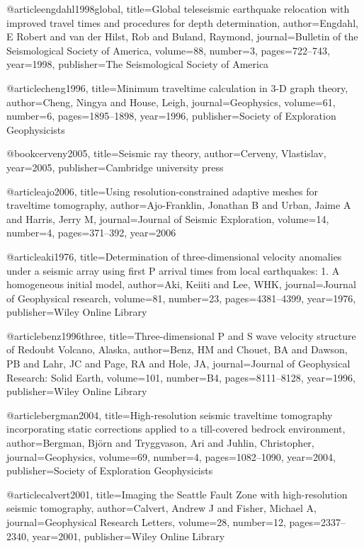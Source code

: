 @article{engdahl1998global,
  title={Global teleseismic earthquake relocation with improved travel times and procedures for depth determination},
  author={Engdahl, E Robert and van der Hilst, Rob and Buland, Raymond},
  journal={Bulletin of the Seismological Society of America},
  volume={88},
  number={3},
  pages={722--743},
  year={1998},
  publisher={The Seismological Society of America}
}

@article{cheng1996,
  title={Minimum traveltime calculation in 3-D graph theory},
  author={Cheng, Ningya and House, Leigh},
  journal={Geophysics},
  volume={61},
  number={6},
  pages={1895--1898},
  year={1996},
  publisher={Society of Exploration Geophysicists}
}

@book{cerveny2005,
  title={Seismic ray theory},
  author={Cerveny, Vlastislav},
  year={2005},
  publisher={Cambridge university press}
}


@article{ajo2006,
  title={Using resolution-constrained adaptive meshes for traveltime tomography},
  author={Ajo-Franklin, Jonathan B and Urban, Jaime A and Harris, Jerry M},
  journal={Journal of Seismic Exploration},
  volume={14},
  number={4},
  pages={371--392},
  year={2006}
}

@article{aki1976,
  title={Determination of three-dimensional velocity anomalies under a seismic array using first P arrival times from local earthquakes: 1. A homogeneous initial model},
  author={Aki, Keiiti and Lee, WHK},
  journal={Journal of Geophysical research},
  volume={81},
  number={23},
  pages={4381--4399},
  year={1976},
  publisher={Wiley Online Library}
}


@article{benz1996three,
  title={Three-dimensional P and S wave velocity structure of Redoubt Volcano, Alaska},
  author={Benz, HM and Chouet, BA and Dawson, PB and Lahr, JC and Page, RA and Hole, JA},
  journal={Journal of Geophysical Research: Solid Earth},
  volume={101},
  number={B4},
  pages={8111--8128},
  year={1996},
  publisher={Wiley Online Library}
}

@article{bergman2004,
  title={High-resolution seismic traveltime tomography incorporating static corrections applied to a till-covered bedrock environment},
  author={Bergman, Bj{\"o}rn and Tryggvason, Ari and Juhlin, Christopher},
  journal={Geophysics},
  volume={69},
  number={4},
  pages={1082--1090},
  year={2004},
  publisher={Society of Exploration Geophysicists}
}



@article{calvert2001,
  title={Imaging the Seattle Fault Zone with high-resolution seismic tomography},
  author={Calvert, Andrew J and Fisher, Michael A},
  journal={Geophysical Research Letters},
  volume={28},
  number={12},
  pages={2337--2340},
  year={2001},
  publisher={Wiley Online Library}
}





